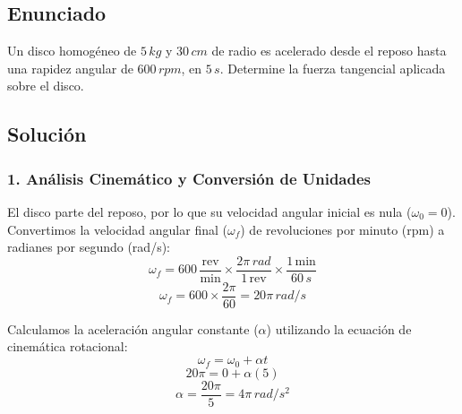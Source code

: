 \documentclass[12pt, a4paper]{article}
\begin{document}
\newpage

\subsection*{Enunciado}
Un disco homogéneo de $5 \, \si{kg}$ y $30 \, \si{cm}$ de radio es acelerado desde el reposo hasta una rapidez angular de $600 \, \si{rpm}$, en $5 \, \si{s}$. Determine la fuerza tangencial aplicada sobre el disco.

\begin{center}
\end{center}

\subsection*{Solución}
\subsubsection*{1. Análisis Cinemático y Conversión de Unidades}
El disco parte del reposo, por lo que su velocidad angular inicial es nula ($\omega_0 = 0$).
Convertimos la velocidad angular final ($\omega_f$) de revoluciones por minuto (\si{rpm}) a radianes por segundo (\si{rad/s}):
$$\omega_f = 600 \, \frac{\text{rev}}{\text{min}} \times \frac{2\pi \, \si{rad}}{1 \, \text{rev}} \times \frac{1 \, \text{min}}{60 \, \si{s}}$$
$$\omega_f = 600 \times \frac{2\pi}{60} = 20\pi \, \si{rad/s}$$

Calculamos la aceleración angular constante ($\alpha$) utilizando la ecuación de cinemática rotacional:
$$\omega_f = \omega_0 + \alpha t$$
$$20\pi = 0 + \alpha (5)$$
$$\alpha = \frac{20\pi}{5} = 4\pi \, \si{rad/s^2}$$
\end{document}
